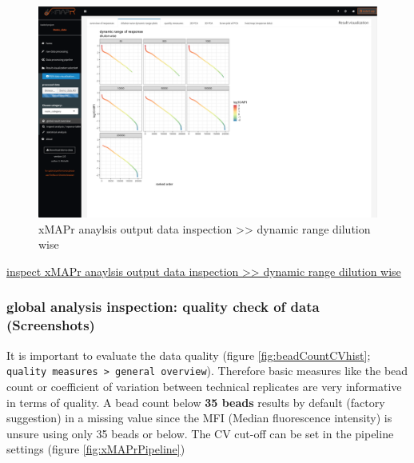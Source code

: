 \documentclass[
]{book}
\begin{document}
\begin{figure}

{\centering \includegraphics[width=50.5in]{figures/global_result_overview_dyn_range_dilution_wise} 

}

\caption{xMAPr anaylsis output data inspection >> dynamic range dilution wise}\label{fig:dynamicRangeDilutionWise}
\end{figure}

\href{figures/global_result_overview_dyn_range_dilution_wise.png}{inspect xMAPr anaylsis output data inspection \textgreater\textgreater{} dynamic range dilution wise}

\hypertarget{global-analysis-inspection-quality-check-of-data-screenshots}{%
\subsubsection{global analysis inspection: quality check of data (Screenshots)}\label{global-analysis-inspection-quality-check-of-data-screenshots}}

It is important to evaluate the data quality (figure \ref{fig:beadCountCVhist}; \texttt{quality\ measures\ \textgreater{}\ general\ overview}). Therefore basic measures like the bead count or coefficient of variation between technical replicates are very informative in terms of quality.
A bead count below \textbf{35 beads} results by default (factory suggestion) in a missing value since the MFI (Median fluorescence intensity) is unsure using only 35 beads or below.
The CV cut-off can be set in the pipeline settings (figure \ref{fig:xMAPrPipeline})
\end{document}
